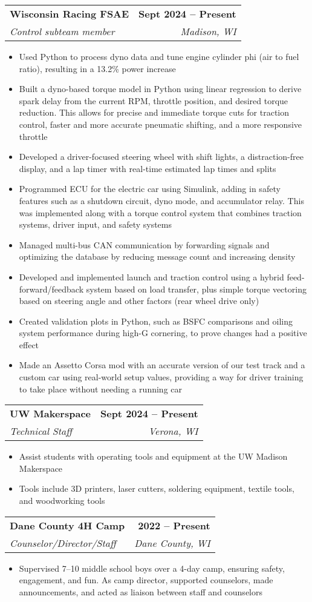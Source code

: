 \documentclass[letterpaper,11pt]{article}
\makeatletter
\newcommand{\resumeItem}[1]{
  \item\small{
    {#1 \vspace{-2pt}}
  }
}
\newcommand{\resumeSubheading}[4]{
  \vspace{-2pt}\item
    \begin{tabular*}{1.0\textwidth}[t]{l@{\extracolsep{\fill}}r}
      \textbf{#1} & \textbf{\small #2} \\
      \textit{\small#3} & \textit{\small #4} \\
    \end{tabular*}\vspace{-7pt}
}
\newcommand{\resumeItemListStart}{\begin{itemize}}
\newcommand{\resumeItemListEnd}{\end{itemize}\vspace{-5pt}}
\makeatother
\begin{document}
    \resumeSubheading
      {Wisconsin Racing FSAE}{Sept 2024 -- Present}
      {Control subteam member}{Madison, WI}
      \resumeItemListStart
        \resumeItem{Used Python to process dyno data and tune engine cylinder phi (air to fuel ratio), resulting in a 13.2\% power increase}
        \resumeItem{Built a dyno-based torque model in Python using linear regression to derive spark delay from the current RPM, throttle position, and desired torque reduction. This allows for precise and immediate torque cuts for traction control, faster and more accurate pneumatic shifting, and a more responsive throttle}
        \resumeItem{Developed a driver-focused steering wheel with shift lights, a distraction-free display, and a lap timer with real-time estimated lap times and splits}
        \resumeItem{Programmed ECU for the electric car using Simulink, adding in safety features such as a shutdown circuit, dyno mode, and accumulator relay. This was implemented along with a torque control system that combines traction systems, driver input, and safety systems}
        \resumeItem{Managed multi-bus CAN communication by forwarding signals and optimizing the database by reducing message count and increasing density}
        \resumeItem{Developed and implemented launch and traction control using a hybrid feed-forward/feedback system based on load transfer, plus simple torque vectoring based on steering angle and other factors (rear wheel drive only)}
        \resumeItem{Created validation plots in Python, such as BSFC comparisons and oiling system performance during high-G cornering, to prove changes had a positive effect}
        \resumeItem{Made an Assetto Corsa mod with an accurate version of our test track and a custom car using real-world setup values, providing a way for driver training to take place without needing a running car}
      \resumeItemListEnd

    \resumeSubheading
      {UW Makerspace}{Sept 2024 -- Present}
      {Technical Staff}{Verona, WI}
      \resumeItemListStart
        \resumeItem{Assist students with operating tools and equipment at the UW Madison Makerspace}
        \resumeItem{Tools include 3D printers, laser cutters, soldering equipment, textile tools, and woodworking tools}
      \resumeItemListEnd

    \resumeSubheading
      {Dane County 4H Camp}{2022 -- Present}
      {Counselor/Director/Staff}{Dane County, WI}
      \resumeItemListStart
      \resumeItem{Supervised 7–10 middle school boys over a 4-day camp, ensuring safety, engagement, and fun. As camp director, supported counselors, made announcements, and acted as liaison between staff and counselors}
      \resumeItemListEnd
    
\end{document}

